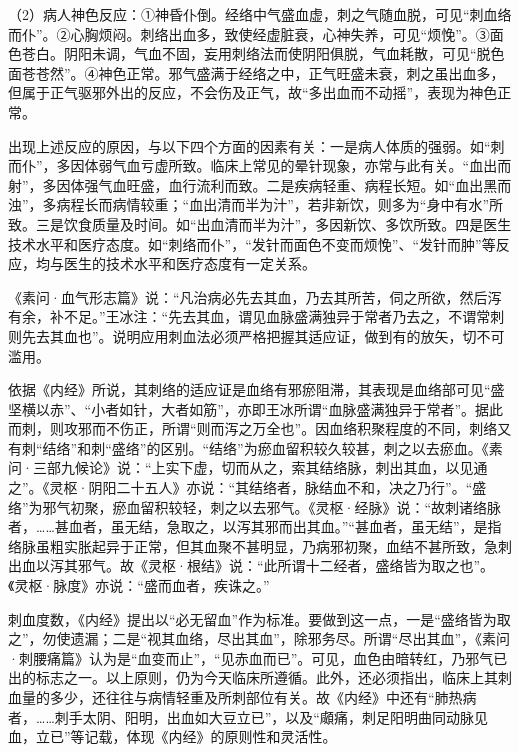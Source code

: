 \documentclass[12pt]{ctexbook}%
\begin{document}
（2）病人神色反应：①神昏仆倒。经络中气盛血虚，刺之气随血脱，可见“刺血络而仆”。②心胸烦闷。刺络出血多，致使经虚脏衰，心神失养，可见“烦悗”。③面色苍白。阴阳未调，气血不固，妄用刺络法而使阴阳俱脱，气血耗散，可见“脱色面苍苍然”。④神色正常。邪气盛满于经络之中，正气旺盛未衰，刺之虽出血多，但属于正气驱邪外出的反应，不会伤及正气，故“多出血而不动摇”，表现为神色正常。

出现上述反应的原因，与以下四个方面的因素有关：一是病人体质的强弱。如“刺而仆”，多因体弱气血亏虚所致。临床上常见的晕针现象，亦常与此有关。“血出而射”，多因体强气血旺盛，血行流利而致。二是疾病轻重、病程长短。如“血出黑而浊”，多病程长而病情较重；“血出清而半为汁”，若非新饮，则多为“身中有水”所致。三是饮食质量及时间。如“出血清而半为汁”，多因新饮、多饮所致。四是医生技术水平和医疗态度。如“刺络而仆”，“发针而面色不变而烦悗”、“发针而肿”等反应，均与医生的技术水平和医疗态度有一定关系。



《素问·血气形志篇》说：“凡治病必先去其血，乃去其所苦，伺之所欲，然后泻有余，补不足。”王冰注：“先去其血，谓见血脉盛满独异于常者乃去之，不谓常刺则先去其血也”。说明应用刺血法必须严格把握其适应证，做到有的放矢，切不可滥用。

依据《内经》所说，其刺络的适应证是血络有邪瘀阻滞，其表现是血络部可见“盛坚横以赤”、“小者如针，大者如筋”，亦即王冰所谓“血脉盛满独异于常者”。据此而刺，则攻邪而不伤正，所谓“则而泻之万全也”。因血络积聚程度的不同，刺络又有刺“结络”和刺“盛络”的区别。“结络”为瘀血留积较久较甚，刺之以去瘀血。《素问·三部九候论》说：“上实下虚，切而从之，索其结络脉，刺出其血，以见通之”。《灵枢·阴阳二十五人》亦说：“其结络者，脉结血不和，决之乃行”。“盛络”为邪气初聚，瘀血留积较轻，刺之以去邪气。《灵枢·经脉》说：“故刺诸络脉者，……甚血者，虽无结，急取之，以泻其邪而出其血。”“甚血者，虽无结”，是指络脉虽粗实胀起异于正常，但其血聚不甚明显，乃病邪初聚，血结不甚所致，急刺出血以泻其邪气。故《灵枢·根结》说：“此所谓十二经者，盛络皆为取之也”。《灵枢·脉度》亦说：“盛而血者，疾诛之。”

刺血度数，《内经》提出以“必无留血”作为标准。要做到这一点，一是“盛络皆为取之”，勿使遗漏；二是“视其血络，尽出其血”，除邪务尽。所谓“尽出其血”，《素问·刺腰痛篇》认为是“血变而止”，“见赤血而已”。可见，血色由暗转红，乃邪气已出的标志之一。以上原则，仍为今天临床所遵循。此外，还必须指出，临床上其刺血量的多少，还往往与病情轻重及所刺部位有关。故《内经》中还有“肺热病者，……刺手太阴、阳明，出血如大豆立已”，以及“顑痛，刺足阳明曲同动脉见血，立已”等记载，体现《内经》的原则性和灵活性。
\end{document}
